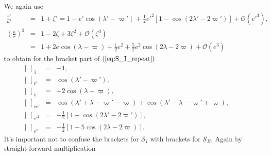 \documentclass [12pt, a4paper] {article}
\begin{document}
We again use 
\begin {eqnarray}
    \frac{r'}{a'}
    &=& 
    1 + \zeta'
    =
    1 - e'\cos(\lambda' - \varpi') + \frac{1}{2}e'^2[1 - \cos(2\lambda' - 2\varpi')]
    +
    \mathcal{O}(e'^3),
    \\
    \left(
        \frac{a}{r}
    \right)^2
    &=&
    1 - 2\zeta + 3\zeta^2 + \mathcal{O}(\zeta^3)
    \\
    &=&
    1 + 2e\cos(\lambda - \varpi) + \frac{1}{2}e^2
    + \frac{5}{2}e^2\cos(2\lambda - 2\varpi)
    + \mathcal{O}(e^3)
\end {eqnarray}
to obtain for the bracket part of $(\ref{eq:S_I_repeat})$
\begin {eqnarray}
    \left[\:\right]_1 &=& -1, 
    \\
    \left[\:\right]_{e'} &=& \cos(\lambda' - \varpi'),
    \\
    \left[\:\right]_{e} &=& -2\cos(\lambda - \varpi),
    \\
    \left[\:\right]_{ee'} &=& 
    \cos(\lambda' + \lambda - \varpi' - \varpi) 
    + 
    \cos(\lambda' - \lambda - \varpi' + \varpi),
    \\
    \left[\:\right]_{e'^2} &=& - \frac{1}{2}[1 - \cos(2\lambda' - 2\varpi')],
    \\
    \left[\:\right]_{e^2} &=& - \frac{1}{2}[1 + 5\cos(2\lambda - 2\varpi)].
\end {eqnarray}
It's important not to confuse the brackets for $\mathcal{S}_I$ with brackets for 
$\mathcal{S}_E$. Again by straight-forward multiplication 
\end{document}
